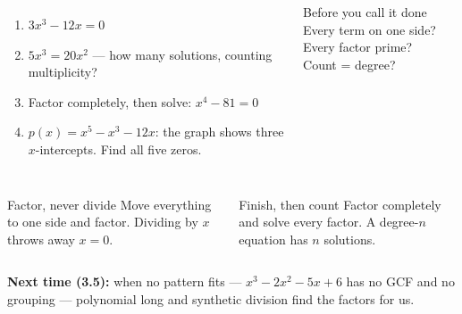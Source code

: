 \documentclass[aspectratio=169, 11pt]{beamer}
\begin{document}
\begin{frame}[t, plain]

  \begin{columns}[T]
      \begin{enumerate}\setlength{\itemsep}{8pt}
        \setcounter{enumi}{14}
        \item $3x^3 - 12x = 0$
        \item $5x^3 = 20x^2$ --- how many solutions, counting multiplicity?
        \item Factor completely, then solve: $x^4 - 81 = 0$
        \item $p(x) = x^5 - x^3 - 12x$: the graph shows three $x$-intercepts. Find all five
              zeros.
      \end{enumerate}
      \begin{block}{Before you call it done}
        Every term on one side?\\[2pt]
        Every factor prime?\\[2pt]
        Count = degree?
      \end{block}
  \end{columns}
\end{frame}

\begin{frame}[t, plain]

  \begin{columns}[T]
      \begin{block}{Factor, never divide}
        Move everything to one side and factor. Dividing by $x$ throws away $x = 0$.
      \end{block}
      \begin{block}{Finish, then count}
        Factor completely and solve every factor. A degree-$n$ equation has $n$ solutions.
      \end{block}
  \end{columns}

  \bigskip
  \textbf{Next time (3.5):} when no pattern fits --- $x^3 - 2x^2 - 5x + 6$ has no GCF and no
  grouping --- polynomial long and synthetic division find the factors for us.
\end{frame}
\end{document}
